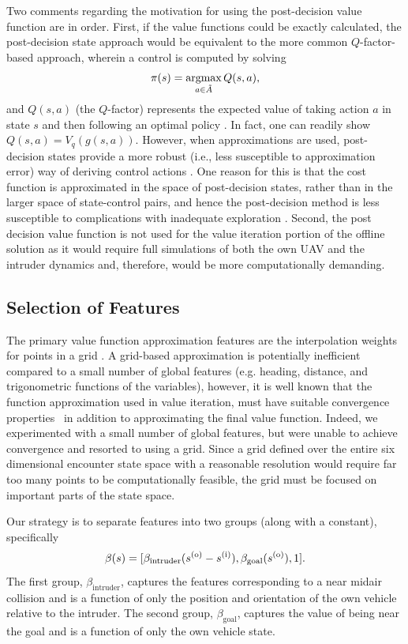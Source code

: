 Two comments regarding the motivation for using the post-decision value function are in order. First, 
if the value functions could be exactly calculated, the post-decision state approach would be equivalent to the more common $Q$-factor-based approach, wherein a  control is computed by solving
\begin{equation}
    \pi(s) = \underset{a \in \tilde{A}}{\argmax} \, Q(s,a) \text{,}
\end{equation}
and $Q(s,a)$ (the $Q$-factor) represents the expected value of taking action $a$ in state $s$ and then following an optimal policy \cite{DB:05}. In fact, one can readily show $Q(s,a) = V_q\left( g(s,a) \right)$. However, when approximations are used, post-decision states provide a more robust (i.e., less susceptible to approximation error) way of deriving control actions \cite{DB:05}. One reason for this is that the cost function is approximated in the space of post-decision states, rather than in the larger space of state-control pairs, and hence the post-decision method is less susceptible to complications with inadequate exploration \cite{DB:05}. Second, the post decision value function is not used for the value iteration portion of the offline solution as it would require full simulations of both the own UAV and the intruder dynamics and, therefore, would be more computationally demanding.

\subsection{Selection of Features} \label{sec:features}

The primary value function approximation features are the interpolation weights for points in a grid \cite{SD:97}. A grid-based approximation is potentially inefficient compared to a small number of global features (e.g. heading, distance, and trigonometric functions of the variables), however, it is well known that the function approximation used in value iteration, must have suitable convergence properties~\cite{JAB-AWM:95} in addition to approximating the final value function. Indeed, we experimented with a small number of global features, but were unable to achieve convergence and resorted to using a grid. Since a grid defined over the entire six dimensional encounter state space with a reasonable resolution would require far too many points to be computationally feasible, the grid must be focused on important parts of the state space.

Our strategy is to separate features into two groups (along with a constant), specifically
\begin{equation}
    \beta(s) = [\beta_\text{intruder}(s^{(\mathrm{o})}-s^{(\mathrm{i})}), \beta_\text{goal}(s^{(\mathrm{o})}), 1] \text{.}
\end{equation}
The first group, $\beta_\text{intruder}$, captures the features corresponding to a near midair collision and is a function of only the position and orientation of the own vehicle relative to the intruder. The second group, $\beta_\text{goal}$, captures the value of being near the goal and is a function of only the own vehicle state.

